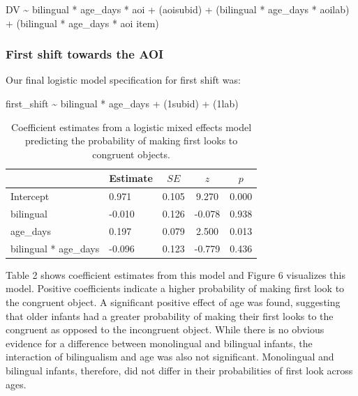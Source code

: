 \documentclass[,man,floatsintext]{apa6}
\begin{document}
DV \textasciitilde{} bilingual * age\_days * aoi +
(aoi\textbar{}subid) +
(bilingual * age\_days * aoi\textbar{}lab) +
(bilingual * age\_days * aoi \textbar{}item)

\hypertarget{first-shift-towards-the-aoi}{%
\subsubsection{First shift towards the AOI}\label{first-shift-towards-the-aoi}}

Our final logistic model specification for first shift was:

first\_shift \textasciitilde{} bilingual * age\_days +
(1\textbar{}subid) +
(1\textbar{}lab)

\begin{table}[tbp]
\begin{center}
\begin{threeparttable}
\caption{\label{tab:coef_table_firstshift}Coefficient estimates from a logistic mixed effects model predicting the probability of making first looks to congruent objects.}
\begin{tabular}{llccc}
\toprule
 & Estimate & $SE$ & $z$ & $p$\\
\midrule
Intercept & 0.971 & 0.105 & 9.270 & 0.000\\
bilingual & -0.010 & 0.126 & -0.078 & 0.938\\
age\_days & 0.197 & 0.079 & 2.500 & 0.013\\
bilingual * age\_days & -0.096 & 0.123 & -0.779 & 0.436\\
\bottomrule
\end{tabular}
\end{threeparttable}
\end{center}
\end{table}

\noindent Table 2 shows coefficient estimates from this model and Figure 6 visualizes this model. Positive coefficients indicate a higher probability of making first look to the congruent object. A significant positive effect of age was found, suggesting that older infants had a greater probability of making their first looks to the congruent as opposed to the incongruent object. While there is no obvious evidence for a difference between monolingual and bilingual infants, the interaction of bilingualism and age was also not significant. Monolingual and bilingual infants, therefore, did not differ in their probabilities of first look across ages.
\end{document}
